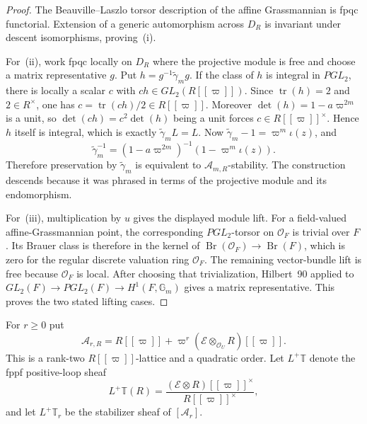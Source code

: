 \documentclass[11pt]{article}
\theoremstyle{definition}
\theoremstyle{remark}
\begin{document}
\begin{proof}
The Beauville--Laszlo torsor description of the affine Grassmannian is fpqc
functorial.  Extension of a generic automorphism across $D_R$ is invariant
under descent isomorphisms, proving~\textup{(i)}.

For~\textup{(ii)}, work fpqc locally on $D_R$ where the projective module is
free and choose a matrix representative $g$.  Put
$h=g^{-1}\widetilde\gamma_mg$.  If the class of $h$ is integral in $PGL_2$,
there is locally a scalar $c$ with $ch\in GL_2(R[[\varpi]])$.  Since
$\operatorname{tr}(h)=2$ and $2\in R^\times$, one has
$c=\operatorname{tr}(ch)/2\in R[[\varpi]]$.  Moreover
$\det(h)=1-a\varpi^{2m}$ is a unit, so
$\det(ch)=c^2\det(h)$ being a unit forces
$c\in R[[\varpi]]^\times$.  Hence $h$ itself is integral, which is exactly
$\widetilde\gamma_mL=L$.  Now
$\widetilde\gamma_m-1=\varpi^m\iota(z)$, and
\[
 \widetilde\gamma_m^{-1}
 =(1-a\varpi^{2m})^{-1}(1-\varpi^m\iota(z)).
\]
Therefore preservation by $\widetilde\gamma_m$ is equivalent to
$\mathcal A_{m,R}$-stability.  The construction descends because it was
phrased in terms of the projective module and its endomorphism.

For~\textup{(iii)}, multiplication by $u$ gives the displayed module lift.
For a field-valued affine-Grassmannian point, the corresponding $PGL_2$-torsor
on $\mathcal O_F$ is trivial over $F$.  Its Brauer class is therefore in the
kernel of $\operatorname{Br}(\mathcal O_F)\to\operatorname{Br}(F)$, which is
zero for the regular discrete valuation ring $\mathcal O_F$.  The remaining
vector-bundle lift is free because $\mathcal O_F$ is local.  After choosing
that trivialization, Hilbert~90 applied to
$GL_2(F)\to PGL_2(F)\to H^1(F,\mathbb G_m)$ gives a matrix representative.
This proves the two stated lifting cases.
\end{proof}

For $r\ge0$ put
\begin{equation}
 \mathcal A_{r,R}=R[[\varpi]]+\varpi^r
        (\mathcal E\otimes_{\mathcal O_U}R)[[\varpi]].
 \label{eq:PGL2-order-lattice}
\end{equation}
This is a rank-two $R[[\varpi]]$-lattice and a quadratic order.  Let
$L^+\mathbb T$ denote the fppf positive-loop sheaf
\begin{equation}
 L^+\mathbb T(R)=
 \frac{(\mathcal E\otimes R)[[\varpi]]^\times}
      {R[[\varpi]]^\times},
 \label{eq:PGL2-positive-loop-torus}
\end{equation}
and let $L^+\mathbb T_r$ be the stabilizer sheaf of
$[\mathcal A_r]$.
\end{document}

